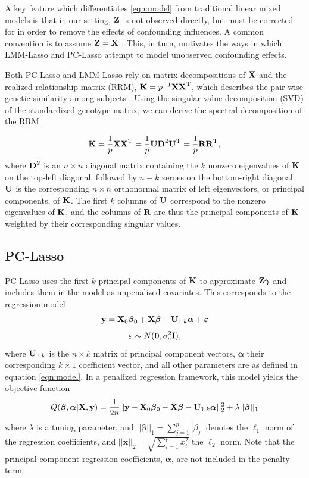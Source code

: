 A key feature which differentiates \eqref{eqn:model} from traditional linear mixed models is that in our setting, $\textbf{Z}$ is not observed directly, but must be corrected for in order to remove the effects of confounding influences. A common convention is to assume $\textbf{Z} = \textbf{X}$ \citep{wang2018multiplex, lippert2011fast, yang2014advantages}. This, in turn, motivates the ways in which LMM-Lasso and PC-Lasso attempt to model unobserved confounding effects. 

Both PC-Lasso and LMM-Lasso rely on matrix decompositions of $\textbf{X}$ and the realized relationship matrix (RRM), $\textbf{K} = p^{-1} \textbf{X} \textbf{X}^{\text{T}}$, which describes the pair-wise genetic similarity among subjects \citep{hayes2009increased}. Using the singular value decomposition (SVD) of the standardized genotype matrix, we can derive the spectral decomposition of the RRM: 

\begin{equation}
    \label{eqn:k}
    \textbf{K} = \frac{1}{p} \textbf{X} \textbf{X}^{\text{T}} = \frac{1}{p} \textbf{U} \textbf{D}^2 \textbf{U}^{\text{T}} = \frac{1}{p} \textbf{R} \textbf{R}^{\text{T}},
\end{equation}
where $\textbf{D}^2$ is an $n \times n$ diagonal matrix containing the $k$ nonzero eigenvalues of $\textbf{K}$ on the top-left diagonal, followed by $n - k$ zeroes on the bottom-right diagonal. $\textbf{U}$ is the corresponding $n \times n$ orthonormal matrix of left eigenvectors, or principal components, of $\textbf{K}$. The first $k$ columns of $\textbf{U}$ correspond to the nonzero eigenvalues of $\textbf{K}$, and the columns of $\textbf{R}$ are thus the principal components of $\textbf{K}$ weighted by their corresponding singular values. 

\subsection{PC-Lasso}
PC-Lasso uses the first $k$ principal components of $\textbf{K}$ to approximate $\textbf{Z}\boldsymbol{\gamma}$ and includes them in the model as unpenalized covariates. This corresponds to the regression model
\begin{equation}
    \label{eqn:pca_reg}
    \textbf{y} = \textbf{X}_0\boldsymbol{\beta}{}_0 + \textbf{X}\boldsymbol{\beta}{} + \textbf{U}_{1:k}\boldsymbol{\alpha} + \boldsymbol{\varepsilon}{} 
\end{equation}
$$ \boldsymbol{\varepsilon}{} \sim N(\boldsymbol{0}, \sigma^2_e \textbf{I}), $$
where $\textbf{U}_{1:k}$ is the $n \times k$ matrix of principal component vectors, $\boldsymbol{\alpha}$ their corresponding $k \times 1$ coefficient vector, and all other parameters are as defined in equation \eqref{eqn:model}. In a penalized regression framework, this model yields the objective function
\begin{equation}
    \label{eqn:pca_obj}
    Q(\boldsymbol{\beta}{}, \boldsymbol{\alpha}|\textbf{X}, \textbf{y}) = \frac{1}{2n} ||\textbf{y} - \textbf{X}_0\boldsymbol{\beta}{}_0 - \textbf{X} \boldsymbol{\beta}{}- \textbf{U}_{1:k}\boldsymbol{\alpha}||_2^2 + \lambda || \boldsymbol{\beta}{} ||_1
\end{equation}
where $\lambda$ is a tuning parameter, and $|| \boldsymbol{\beta} ||_1 = \sum_{j=1}^p |\beta_j|$ denotes the $\ell_1$ norm of the regression coefficients, and $||\mathbf{x}||_2 = \sqrt{\sum_{i=1}^p x_i^2}$ the $\ell_2$ norm. Note that the principal component regression coefficients, $\boldsymbol{\alpha}$, are not included in the penalty term. 

